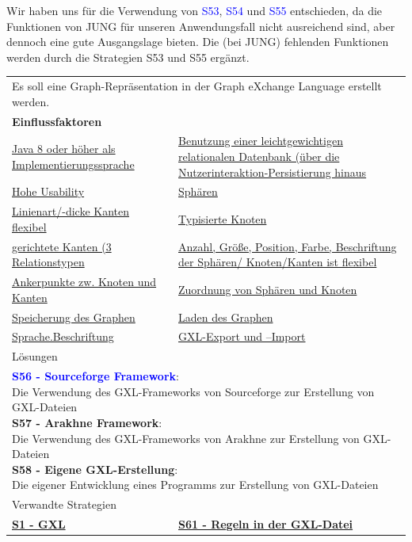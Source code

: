 \documentclass[enabledeprecatedfontcommands,fontsize=11pt,paper=a4,twoside]{scrartcl}
\newcounter{one}
\newcommand{\cb}[1]{{\textcolor{blue}{#1}}}
\begin{document}
	\begin{onehalfspace}
		Wir haben uns für die Verwendung von \cb{S53}, \cb{S54} und \cb{S55} entschieden, da die Funktionen von JUNG für unseren Anwendungsfall nicht ausreichend sind, aber dennoch eine gute Ausgangslage bieten. Die (bei JUNG) fehlenden Funktionen werden durch die Strategien S53 und S55 ergänzt.
	\end{onehalfspace}
	
	\newpage
	\begin{tabular} {|p{8cm} p{8cm}|}
		\hline
		\rowcolor{prob}\multicolumn{2}{|l|}{\parbox{16cm}{\textbf{22: GXL Erstellung}}} \\  \hline\hline 
		\multicolumn{2}{|l|}{\parbox{16cm}{Es soll eine Graph-Repräsentation in der Graph eXchange Language erstellt werden.}}\rule{0pt}{1ex}\\ \hline
		\multicolumn{2}{|l|}{\textbf{Einflussfaktoren}}\\
		\hyperlink{b}{Java 8 oder höher als Implementierungssprache}  & 
		\hyperlink {e}{Benutzung einer leichtgewichtigen relationalen Datenbank (über die Nutzerinteraktion-Persistierung hinaus}\\ 
		\hyperlink {g}{Hohe Usability}&
		\hyperlink {n}{Sphären} \\
		\hyperlink {o}{Linienart/-dicke Kanten flexibel}&
		\hyperlink {p}{Typisierte Knoten} \\
		\hyperlink {q}{gerichtete Kanten (3 Relationstypen} &
		\hyperlink {r}{Anzahl, Größe, Position, Farbe, Beschriftung der Sphären/ Knoten/Kanten ist flexibel} \\
		\hyperlink {s}{Ankerpunkte zw. Knoten und Kanten} &
		\hyperlink {t}{Zuordnung von Sphären und Knoten} \\
		\hyperlink {v}{Speicherung des Graphen} &
		\hyperlink {w}{Laden des Graphen} \\
		\hyperlink {hh}{Sprache.Beschriftung}&
		\hyperlink {jj}{GXL-Export und –Import}
		\\ \hline
		\multicolumn{2}{|l|}{Lösungen} \\
		\multicolumn{2}{|l|}{\parbox{16cm}{
				\textbf{\cb{\hypertarget{ttt}{S56 - Sourceforge Framework}}}: \\
				Die Verwendung des GXL-Frameworks von Sourceforge zur Erstellung von GXL-Dateien \\
				\textbf{S57 - Arakhne Framework}: \\
				Die Verwendung des GXL-Frameworks von Arakhne zur Erstellung von GXL-Dateien \\
				\textbf{S58 - Eigene GXL-Erstellung}: \\
				Die eigener Entwicklung eines Programms zur Erstellung von GXL-Dateien 
		} }\\ [6ex] \hline
		\multicolumn{2}{|l|}{Verwandte Strategien} \\
		\textbf{\hyperlink{yy}{S1 - GXL}}&
		\textbf{\hyperlink{vvv}{S61 - Regeln in der GXL-Datei}}
		\\\hline
	\end{tabular}\\ \\ \\
\end{document}
